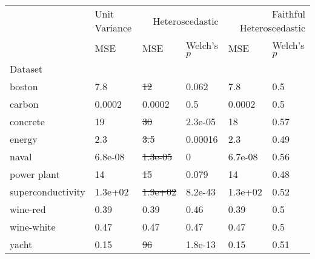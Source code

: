 \begin{tabular}{l|l|ll|ll}
\toprule
 & Unit Variance & \multicolumn{2}{r}{Heteroscedastic} & \multicolumn{2}{r}{Faithful Heteroscedastic} \\
 & MSE & MSE & Welch's $p$ & MSE & Welch's $p$ \\
Dataset &  &  &  &  &  \\
\midrule
boston & 7.8 & \sout{12} & 0.062 & 7.8 & 0.5 \\
carbon & 0.0002 & 0.0002 & 0.5 & 0.0002 & 0.5 \\
concrete & 19 & \sout{30} & 2.3e-05 & 18 & 0.57 \\
energy & 2.3 & \sout{3.5} & 0.00016 & 2.3 & 0.49 \\
naval & 6.8e-08 & \sout{1.3e-05} & 0 & 6.7e-08 & 0.56 \\
power plant & 14 & \sout{15} & 0.079 & 14 & 0.48 \\
superconductivity & 1.3e+02 & \sout{1.9e+02} & 8.2e-43 & 1.3e+02 & 0.52 \\
wine-red & 0.39 & 0.39 & 0.46 & 0.39 & 0.5 \\
wine-white & 0.47 & 0.47 & 0.47 & 0.47 & 0.5 \\
yacht & 0.15 & \sout{96} & 1.8e-13 & 0.15 & 0.51 \\
\bottomrule
\end{tabular}
